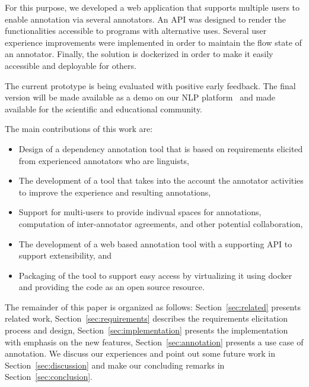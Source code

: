 For this purpose, we developed a web application that supports multiple users to enable annotation via several annotators.
An API was designed to render the functionalities accessible to programs with alternative uses.
Several user experience improvements were implemented in order to maintain the flow state of an annotator.
Finally, the solution is dockerized in order to make it easily accessible and deployable for others. 

The current prototype is being evaluated with positive early feedback. 
The final version will be made available as a demo on our NLP platform~\cite{DIP} and made available for the scientific and educational community. 

The main contributions of this work are:
\begin{itemize}
        \item Design of a dependency annotation tool that is based on requirements elicited from experienced annotators who are linguists,
        \item The development of a tool that takes into the account the annotator activities to improve the experience and resulting annotations,
        \item Support for multi-users to provide indivual spaces for annotations, computation of inter-annotator agreements, and other potential collaboration, 
        \item The development of a web based annotation tool with a supporting API to support extensibility, and
        \item Packaging of the tool to support easy access by virtualizing it using docker and providing the code as an open source resource. 
\end{itemize}
The remainder of this paper is organized as follows: 
Section~\ref{sec:related} presents related work, 
Section~\ref{sec:requirements} describes the requirements elicitation process and design, 
Section~\ref{sec:implementation} presents the implementation with emphasis on the new features, 
Section~\ref{sec:annotation} presents a use case of annotation.
We discuss our experiences and point out some future work in Section~\ref{sec:discussion} and make our concluding remarks in Section~\ref{sec:conclusion}.
